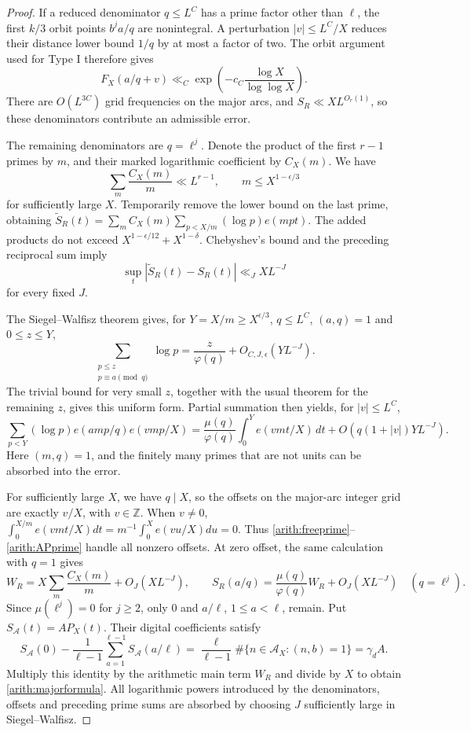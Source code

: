 \documentclass[11pt,a4paper]{article}
\theoremstyle{paperplain}
\numberwithin{equation}{section}
\begin{document}
\begin{proof}
If a reduced denominator $q\le L^C$ has a prime factor other than $\ell$,
the first $k/3$ orbit points $b^ja/q$ are nonintegral. A perturbation
$|v|\le L^C/X$ reduces their distance lower bound $1/q$ by at most
a factor of two. The orbit argument used for Type I therefore gives
\[
 F_X(a/q+v)\ll_C
       \exp\left(-c_C\frac{\log X}{\log\log X}\right).
\]
There are $O(L^{3C})$ grid frequencies on the major arcs, and
$S_R\ll X L^{O_r(1)}$, so these denominators contribute an admissible
error.

The remaining denominators are $q=\ell^j$. Denote the product of the
first $r-1$ primes by $m$, and their marked logarithmic coefficient
by $C_X(m)$. We have
\[
 \sum_m\frac{C_X(m)}m\ll L^{r-1},\qquad m\le X^{1-\epsilon/3}
\]
for sufficiently large $X$.
Temporarily remove the lower bound on the last prime, obtaining
$\widetilde S_R(t)=\sum_mC_X(m)\sum_{p<X/m}(\log p)e(mpt)$.
The added products do not exceed $X^{1-\epsilon/12}+X^{1-\delta}$.
Chebyshev's bound and the preceding reciprocal sum imply
\begin{equation}\label{arith:freeprime}
 \sup_t|\widetilde S_R(t)-S_R(t)|\ll_J XL^{-J}
\end{equation}
for every fixed $J$.

The Siegel--Walfisz theorem \cite[Corollary~5.29]{IwaniecKowalski2004} gives, for
$Y=X/m\ge X^{\epsilon/3}$,
$q\le L^C$, $(a,q)=1$ and $0\le z\le Y$,
\[
 \sum_{\substack{p\le z\\p\equiv a\pmod q}}\log p
       =\frac z{\varphi(q)}+O_{C,J,\epsilon}(YL^{-J}).
\]
The trivial bound for very small $z$, together with the usual theorem
for the remaining $z$, gives this uniform form.
Partial summation then yields, for $|v|\le L^C$,
\begin{equation}\label{arith:APprime}
 \sum_{p<Y}(\log p)e(amp/q)e(vmp/X)
 =\frac{\mu(q)}{\varphi(q)}\int_0^Y e(vmt/X)\,dt
       +O(q(1+|v|)YL^{-J}).
\end{equation}
Here $(m,q)=1$, and the finitely many primes that are not units can be
absorbed into the error.

For sufficiently large $X$, we have $q\mid X$, so the offsets on the
major-arc integer grid are exactly $v/X$, with $v\in\mathbb Z$.
When $v\ne0$,
$\int_0^{X/m}e(vmt/X)dt=m^{-1}\int_0^Xe(vu/X)du=0$.
Thus \eqref{arith:freeprime}--\eqref{arith:APprime} handle all nonzero
offsets. At zero offset, the same calculation with $q=1$ gives
\[
 W_R=X\sum_m\frac{C_X(m)}m+O_J(XL^{-J}),
 \qquad
 S_R(a/q)=\frac{\mu(q)}{\varphi(q)}W_R+O_J(XL^{-J})
 \quad(q=\ell^j).
\]
Since $\mu(\ell^j)=0$ for $j\ge2$, only $0$ and $a/\ell$,
$1\le a<\ell$, remain. Put $S_{\mathcal A}(t)=AP_X(t)$.
Their digital coefficients satisfy
\[
 S_{\mathcal A}(0)-\frac1{\ell-1}
                  \sum_{a=1}^{\ell-1}S_{\mathcal A}(a/\ell)
 =\frac{\ell}{\ell-1}\#\{n\in\mathcal A_X:(n,b)=1\}
 =\gamma_d A.
\]
Multiply this identity by the arithmetic main term $W_R$ and divide
by $X$ to obtain \eqref{arith:majorformula}. All logarithmic powers
introduced by the denominators, offsets and preceding prime sums
are absorbed by choosing $J$ sufficiently large in Siegel--Walfisz.
\end{proof}
\end{document}
